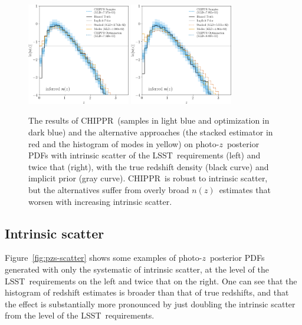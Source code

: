 \documentclass[iop]{emulateapj}
\newcommand{\Fig}[1]{Figure~\ref{#1}}
\newcommand{\project}[1]{\textsc{#1}}
\newcommand{\lsst}{\project{LSST}}
\newcommand{\Chippr}{\project{CHIPPR}}
\newcommand{\pz}{photo-$z$}
\newcommand{\pzpdf}{\pz\ posterior PDF}
\newcommand{\nz}{$n(z)$}
\begin{document}
\begin{figure}
	\begin{center}
		\includegraphics[width=0.4\textwidth]{results_scatter_lo.png}
		\includegraphics[width=0.4\textwidth]{results_scatter_hi.png}
		\caption{
			The results of \Chippr\ (samples in light blue and optimization in dark blue) and the alternative approaches (the stacked estimator in red and the histogram of modes in yellow) on \pzpdf s with intrinsic scatter of the \lsst\ requirements (left) and twice that (right), with the true redshift density (black curve) and implicit prior (gray curve).
			\Chippr\ is robust to intrinsic scatter, but the alternatives suffer from overly broad \nz\ estimates that worsen with increasing intrinsic scatter.
		}
		\label{fig:results-scatter}
	\end{center}
\end{figure}

\subsection{Intrinsic scatter}
\label{sec:scatter}

\Fig{fig:pzs-scatter} shows some examples of \pzpdf s generated with only the systematic of intrinsic scatter, at the level of the \lsst\ requirements on the left and twice that on the right.
One can see that the histogram of redshift estimates is broader than that of true redshifts, and that the effect is substantially more pronounced by just doubling the intrinsic scatter from the level of the \lsst\ requirements.
\end{document}
